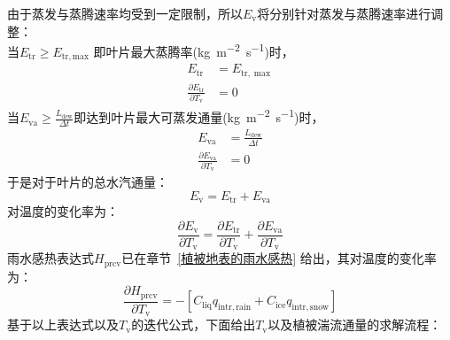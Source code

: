 由于蒸发与蒸腾速率均受到一定限制，所以$E_{\mathrm{v}}$将分别针对蒸发与蒸腾速率进行调整：\\
当$ E_{\mathrm{tr}} \geqslant E_{\mathrm{tr,max}}$ 即叶片最大蒸腾率(\unit{kg.m^{-2}.s^{-1}})时，
\begin{equation}
  \begin{aligned}
    E_{\mathrm{tr}} &=  E_{\mathrm{tr, \max }} \\[1ex]
    \frac{\partial E_{\mathrm{tr}}}{\partial T_{\mathrm{v}}} &= 0
  \end{aligned}
\end{equation}
当$E_{\mathrm{va}} \geqslant \frac{L_{\mathrm{dew}}}{\Delta t}$即达到叶片最大可蒸发通量(\unit{kg.m^{-2}.s^{-1}})时，
\begin{equation}
  \begin{aligned}
    E_{\mathrm{va}} &= \frac{L_{\mathrm{dew}}}{\Delta t} \\[1ex]
    \frac{\partial E_{\mathrm{va}}}{\partial T_{\mathrm{v}}} &= 0
  \end{aligned}
\end{equation}
于是对于叶片的总水汽通量：
\begin{equation}
  E_{\mathrm{v}} = E_{\mathrm{tr}}+E_{\mathrm{va}}
\end{equation}
对温度的变化率为：
\begin{equation}
  \frac{\partial E_{\mathrm{v}}}{\partial T_{\mathrm{v}}} = \frac{\partial E_{\mathrm{tr}}}{\partial T_{\mathrm{v}}}+\frac{\partial E_{\mathrm{va}}}{\partial T_{\mathrm{v}}}
\end{equation}
雨水感热表达式$H_{\mathrm{prcv}}$已在章节~\ref{植被地表的雨水感热} 给出，其对温度的变化率为：
\begin{equation}
  \frac{\partial H_{\mathrm{prcv}}}{\partial T_{\mathrm{v}}}=-\left[C_{\mathrm{liq}} q_{\mathrm{intr,rain}}+C_{\mathrm{ice}} q_{\mathrm{intr,snow}}\right]
\end{equation}
基于以上表达式以及$T_{\mathrm v}$的迭代公式，下面给出$T_{\mathrm v}$以及植被湍流通量的求解流程：
